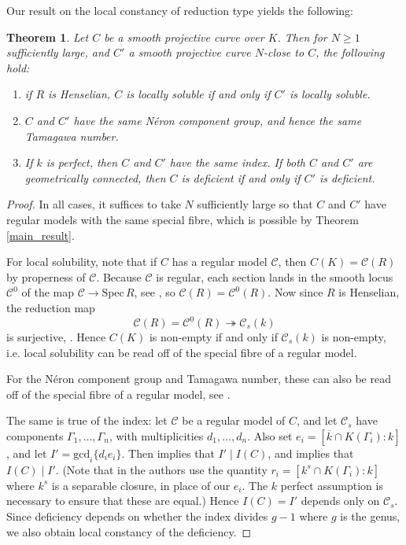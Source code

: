 \documentclass{article}
\theoremstyle{definition}
\theoremstyle{plain}
\newtheorem{thm}[defn]{Theorem}
\theoremstyle{remark}
\newcommand{\spec}{\mathrm{Spec}\,}
\newcommand{\onto}{\twoheadrightarrow}
\begin{document}
	Our result on the local constancy of reduction type yields the following:
	\begin{thm}\label{tamagawa_index_local_constancy}
		Let $C$ be a smooth projective curve over $K$. Then for $N\ge 1$ sufficiently large, and $C'$ a smooth projective curve $N$-close to $C$, the following hold:
		\begin{enumerate}
			\item if $R$ is Henselian, $C$ is locally soluble if and only if $C'$ is locally soluble.
			\item $C$ and $C'$ have the same Néron component group, and hence the same Tamagawa number.
			\item If $k$ is perfect, then $C$ and $C'$ have the same index. If both $C$ and $C'$ are geometrically connected, then $C$ is deficient if and only if $C'$ is deficient.
		\end{enumerate}
	\end{thm}
	\begin{proof}
		In all cases, it suffices to take $N$ sufficiently large so that $C$ and $C'$ have regular models with the same special fibre, which is possible by Theorem \ref{main_result}.
		
		For local solubility, note that if $C$ has a regular model $\mathcal{C}$, then $C(K) = \mathcal{C}(R)$ by properness of $\mathcal{C}$. Because $\mathcal{C}$ is regular, each section lands in the smooth locus $\mathcal{C}^0$ of the map $\mathcal{C}\to \spec R$, see \cite[Corollary 4.4(b)]{silverman_advanced}, so $\mathcal{C}(R) = \mathcal{C}^0(R)$. Now since $R$ is Henselian, the reduction map 
		\[\mathcal{C}(R) = \mathcal{C}^0(R)\onto \mathcal{C}_s(k)\]
		is surjective, \cite[Corollary 6.2.13]{liu2002algebraic}. Hence $C(K)$ is non-empty if and only if $\mathcal{C}_s(k)$ is non-empty, i.e. local solubility can be read off of the special fibre of a regular model.
		
		For the Néron component group and Tamagawa number, these can also be read off of the special fibre of a regular model, see \cite[Theorem 1.1]{Bosch_1999}.
		
		The same is true of the index: let $\mathcal{C}$ be a regular model of $C$, and let $\mathcal{C}_s$ have components $\Gamma_1, \ldots, \Gamma_n$, with multiplicities $d_1, \ldots, d_n$. Also set $e_i = [\overline{k}\cap K(\Gamma_i): k]$, and let $I' = \mathrm{gcd}_i \{d_ie_i\}$. Then \cite[Corollary 1.3]{Bosch_1999} implies that $I' \mid I(C)$, and \cite[Théorème 3.1]{MR1385140} implies that $I(C) \mid I'$. (Note that in \cite{Bosch_1999} the authors use the quantity $r_i = [k^{s}\cap K(\Gamma_i): k]$ where $k^s$ is a separable closure, in place of our $e_i$. The $k$ perfect assumption is necessary to ensure that these are equal.)
		Hence $I(C) = I'$ depends only on $\mathcal{C}_s$. Since deficiency depends on whether the index divides $g-1$ where $g$ is the genus, we also obtain local constancy of the deficiency.
		
	\end{proof}
	
\end{document}
